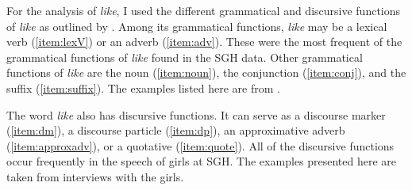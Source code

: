 For the analysis of \textit{like}, I used the different grammatical and discursive functions of \textit{like} as outlined by .  Among its grammatical functions, \textit{like} may be a lexical verb (\ref{item:lexV}) or an adverb (\ref{item:adv}).  These were the most frequent of the grammatical functions of \textit{like} found in the SGH data.  Other grammatical functions of \textit{like} are the noun (\ref{item:noun}), the conjunction (\ref{item:conj}), and the suffix (\ref{item:suffix}).  The examples listed here are from .



\noindent The word \textit{like} also has discursive functions.  It can serve as a discourse marker (\ref{item:dm}), a discourse particle (\ref{item:dp}), an approximative adverb (\ref{item:approxadv}), or a quotative (\ref{item:quote}).  All of the discursive functions occur frequently in the speech of girls at SGH.  The examples presented here are taken from interviews with the girls.


